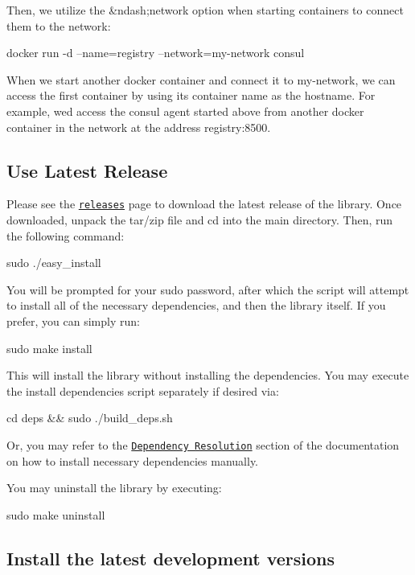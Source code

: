Then, we utilize the \&ndash;network option when starting containers to connect them to the network\+: \begin{DoxyVerb}docker run -d --name=registry --network=my-network consul
\end{DoxyVerb}


When we start another docker container and connect it to my-\/network, we can access the first container by using it\textquotesingle{}s container name as the hostname. For example, we\textquotesingle{}d access the consul agent started above from another docker container in the network at the address \textquotesingle{}registry\+:8500\textquotesingle{}.

\subsection*{Use Latest Release}

Please see the \href{https://github.com/AO-StreetArt/AOSharedServiceLibrary/releases}{\tt releases} page to download the latest release of the library. Once downloaded, unpack the tar/zip file and cd into the main directory. Then, run the following command\+: \begin{DoxyVerb}sudo ./easy_install
\end{DoxyVerb}


You will be prompted for your sudo password, after which the script will attempt to install all of the necessary dependencies, and then the library itself. If you prefer, you can simply run\+: \begin{DoxyVerb}sudo make install
\end{DoxyVerb}


This will install the library without installing the dependencies. You may execute the install dependencies script separately if desired via\+: \begin{DoxyVerb}cd deps && sudo ./build_deps.sh
\end{DoxyVerb}


Or, you may refer to the \href{https://github.com/AO-StreetArt/AOSharedServiceLibrary/tree/master/docs/deps}{\tt Dependency Resolution} section of the documentation on how to install necessary dependencies manually.

You may uninstall the library by executing\+: \begin{DoxyVerb}sudo make uninstall
\end{DoxyVerb}


\subsection*{Install the latest development versions}

